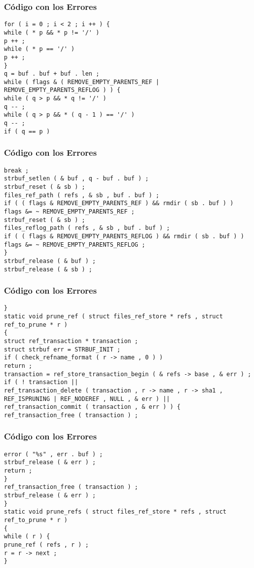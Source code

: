\documentclass{beamer}
\begin{document}
\begin{frame}[fragile]
\frametitle{C\'odigo con los Errores}
\begin{verbatim}
for ( i = 0 ; i < 2 ; i ++ ) { 
while ( * p && * p != '/' ) 
p ++ ; 
while ( * p == '/' ) 
p ++ ; 
} 
q = buf . buf + buf . len ; 
while ( flags & ( REMOVE_EMPTY_PARENTS_REF | REMOVE_EMPTY_PARENTS_REFLOG ) ) { 
while ( q > p && * q != '/' ) 
q -- ; 
while ( q > p && * ( q - 1 ) == '/' ) 
q -- ; 
if ( q == p ) 
\end{verbatim}
\end{frame}
\begin{frame}[fragile]
\frametitle{C\'odigo con los Errores}
\begin{verbatim}
break ; 
strbuf_setlen ( & buf , q - buf . buf ) ; 
strbuf_reset ( & sb ) ; 
files_ref_path ( refs , & sb , buf . buf ) ; 
if ( ( flags & REMOVE_EMPTY_PARENTS_REF ) && rmdir ( sb . buf ) ) 
flags &= ~ REMOVE_EMPTY_PARENTS_REF ; 
strbuf_reset ( & sb ) ; 
files_reflog_path ( refs , & sb , buf . buf ) ; 
if ( ( flags & REMOVE_EMPTY_PARENTS_REFLOG ) && rmdir ( sb . buf ) ) 
flags &= ~ REMOVE_EMPTY_PARENTS_REFLOG ; 
} 
strbuf_release ( & buf ) ; 
strbuf_release ( & sb ) ; 
\end{verbatim}
\end{frame}
\begin{frame}[fragile]
\frametitle{C\'odigo con los Errores}
\begin{verbatim}
} 
static void prune_ref ( struct files_ref_store * refs , struct ref_to_prune * r ) 
{ 
struct ref_transaction * transaction ; 
struct strbuf err = STRBUF_INIT ; 
if ( check_refname_format ( r -> name , 0 ) ) 
return ; 
transaction = ref_store_transaction_begin ( & refs -> base , & err ) ; 
if ( ! transaction || 
ref_transaction_delete ( transaction , r -> name , r -> sha1 , 
REF_ISPRUNING | REF_NODEREF , NULL , & err ) || 
ref_transaction_commit ( transaction , & err ) ) { 
ref_transaction_free ( transaction ) ; 
\end{verbatim}
\end{frame}
\begin{frame}[fragile]
\frametitle{C\'odigo con los Errores}
\begin{verbatim}
error ( "%s" , err . buf ) ; 
strbuf_release ( & err ) ; 
return ; 
} 
ref_transaction_free ( transaction ) ; 
strbuf_release ( & err ) ; 
} 
static void prune_refs ( struct files_ref_store * refs , struct ref_to_prune * r ) 
{ 
while ( r ) { 
prune_ref ( refs , r ) ; 
r = r -> next ; 
} 
\end{verbatim}
\end{frame}
\end{document}
